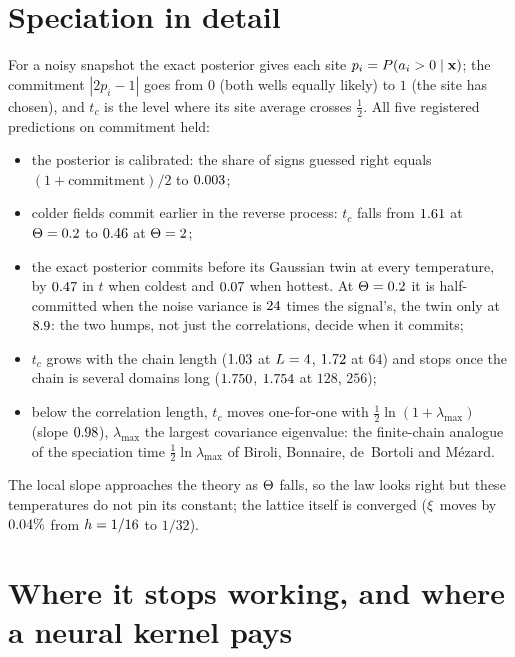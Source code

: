 \documentclass[11pt,a4paper]{article}
\begin{document}
\section{Speciation in detail}
\label{app:speciation}

For a noisy snapshot the exact posterior gives each site $p_i=P(a_i>0\mid\mathbf{x})$; the commitment $|2p_i-1|$ goes from $0$ (both
wells equally likely) to $1$ (the site has chosen), and $t_c$ is the level where its site average crosses $\tfrac12$. All five
registered predictions on commitment held:
\begin{itemize}
\item the posterior is calibrated: the share of signs guessed right equals $(1+\text{commitment})/2$ to $0.003$;
\item colder fields commit earlier in the reverse process: $t_c$ falls from $1.61$ at $\Theta=0.2$ to $0.46$ at
$\Theta=2$;
\item the exact posterior commits before its Gaussian twin at every temperature, by $0.47$ in $t$ when coldest
and $0.07$ when hottest. At $\Theta=0.2$ it is half-committed when the noise variance is $24$ times
the signal's, the twin only at $8.9$: the two humps, not just the correlations, decide when it commits;
\item $t_c$ grows with the chain length ($1.03$ at $L=4$, $1.72$ at $64$) and stops once the
chain is several domains long ($1.750$, $1.754$ at $128$, $256$);
\item below the correlation length, $t_c$ moves one-for-one with $\tfrac12\ln(1+\lambda_{\max})$ (slope $0.98$),
$\lambda_{\max}$ the largest covariance eigenvalue: the finite-chain analogue of the speciation time $\tfrac12\ln\lambda_{\max}$ of
Biroli, Bonnaire, de~Bortoli and Mézard.
\end{itemize}
 The local slope approaches the theory as $\Theta$ falls, so the
law looks right but these temperatures do not pin its constant; the lattice itself is converged ($\xi$ moves by
$0.04\%$ from $h=1/16$ to $1/32$).

\section{Where it stops working, and where a neural kernel pays}
\label{app:limits}
\end{document}
